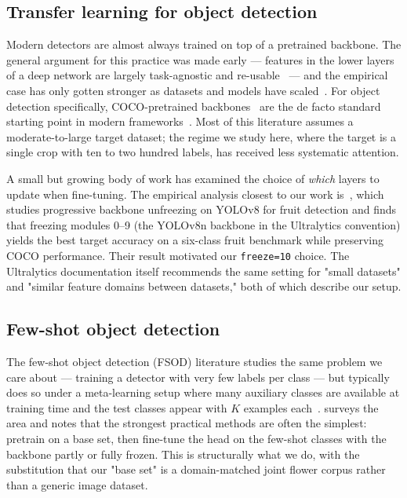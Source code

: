 \subsection{Transfer learning for object detection}

Modern detectors are almost always trained on top of a pretrained backbone. The general argument for this practice was made early --- features in the lower layers of a deep network are largely task-agnostic and re-usable~\cite{yosinski2014transferable} --- and the empirical case has only gotten stronger as datasets and models have scaled~\cite{sun2017revisiting, zhuang2021tlsurvey}. For object detection specifically, COCO-pretrained backbones~\cite{lin2014coco, lin2017fpn, he2016resnet} are the de facto standard starting point in modern frameworks~\cite{terven2023yolo, jocher2023ultralytics}. Most of this literature assumes a moderate-to-large target dataset; the regime we study here, where the target is a single crop with ten to two hundred labels, has received less systematic attention.

A small but growing body of work has examined the choice of \emph{which} layers to update when fine-tuning. The empirical analysis closest to our work is~\cite{gandhi2025fine}, which studies progressive backbone unfreezing on YOLOv8 for fruit detection and finds that freezing modules 0--9 (the YOLOv8n backbone in the Ultralytics convention) yields the best target accuracy on a six-class fruit benchmark while preserving COCO performance. Their result motivated our \texttt{freeze=10} choice. The Ultralytics documentation itself recommends the same setting for "small datasets" and "similar feature domains between datasets," both of which describe our setup.

\subsection{Few-shot object detection}

The few-shot object detection (FSOD) literature studies the same problem we care about --- training a detector with very few labels per class --- but typically does so under a meta-learning setup where many auxiliary classes are available at training time and the test classes appear with $K$ examples each~\cite{kang2019fsod, wang2020fsdetview}. \cite{kohler2023fsdetsurvey} surveys the area and notes that the strongest practical methods are often the simplest: pretrain on a base set, then fine-tune the head on the few-shot classes with the backbone partly or fully frozen. This is structurally what we do, with the substitution that our "base set" is a domain-matched joint flower corpus rather than a generic image dataset.

